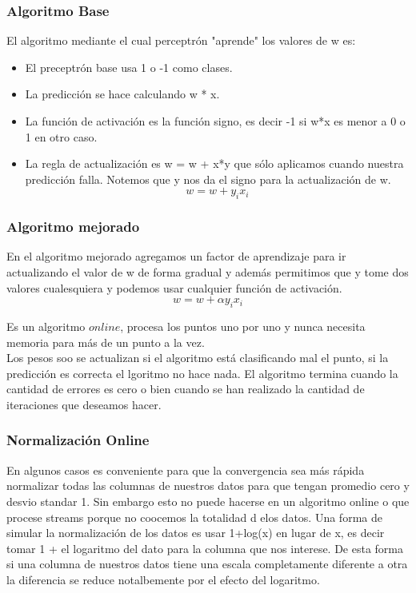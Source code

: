 \documentclass[titlepage,a4paper]{article}
\begin{document}
\subsubsection*{Algoritmo Base}
El algoritmo mediante el cual perceptrón "aprende" los valores de w es: 
\begin{itemize}
\item El preceptrón base usa 1 o -1 como clases. 
\item La predicción se hace calculando w * x. 
\item La función de activación es la función signo, es decir -1 si w*x es menor a 0 o 1 en otro caso. 
\item La regla de actualización es w = w + x*y que sólo aplicamos cuando nuestra predicción falla. Notemos que y nos da el signo para la actualización de w. $$ w = w + y_{i} x_{i} $$
\end{itemize}


\subsubsection*{Algoritmo mejorado}
En el algoritmo mejorado agregamos un factor de aprendizaje para ir actualizando el valor de w de forma gradual y además permitimos que y tome dos valores cualesquiera y podemos usar cualquier  función de activación. \\
$$ w = w+ \alpha y_{i} x_{i} $$

Es un algoritmo $online$, procesa los puntos uno por uno y nunca necesita memoria para más de un punto a la vez.\\

Los pesos soo se actualizan si el algoritmo está clasificando mal el punto, si la predicción es correcta el lgoritmo no hace nada. El algoritmo termina cuando la cantidad de errores es cero o bien cuando se han realizado la cantidad de iteraciones que deseamos hacer. 

\subsubsection*{Normalización Online}
En algunos casos es conveniente para que la convergencia sea más rápida normalizar todas las columnas de nuestros datos para que tengan promedio cero y desvio standar 1. Sin embargo esto no puede hacerse en un algoritmo online o que procese streams porque no coocemos la totalidad d elos datos. Una forma de simular la normalización de los datos es usar 1+log(x) en lugar de x, es decir tomar 1 + el logaritmo del dato para la columna que nos interese. De esta forma si una columna de nuestros datos tiene una escala completamente diferente a otra la diferencia se reduce notalbemente por el efecto del logaritmo.  
\end{document}
